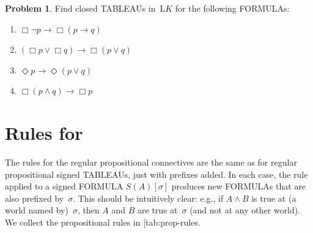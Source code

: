 \documentclass[10pt,a4paper]{article}
\makeatletter
\newcommand*{\olup}[1]{\MakeUppercase{#1}}
\theoremstyle{plain}
\theoremstyle{definition}
\newtheorem{prob}{Problem}[section]
\theoremstyle{remark}
\newcommand*{\olfileid}[3]{}
\newcommand*{\olsection}[1]{\section*{#1}}
\newcommand{\olref}{\@ifnextchar[{\olref@i}{\olref@final}}
\def\olref@i[#1]{\@ifnextchar[{\olref@ii}{\olref@final}}
\def\olref@ii[#1]{\@ifnextchar[{\olref@iii}{\olref@final}}
\def\olref@iii[#1]{\olref@final}
\def\olref@final#1{\ref{#1}}
\providecommand{\lif}{\mathbin{\rightarrow}}
\providecommand{\sFmla}[2]{#1(#2)}
\providecommand{\Log}{\ensuremath{\mathrm{L}}}
\providecommand{\Ax}{\mathrm{Ax}}
\makeatother
\begin{document}
\begin{prob}
  Find closed \olup{tableau}s in~$\Log{K}$ for the following \olup{formula}s:
  \begin{enumerate}
    \item $\Box \lnot p \lif \Box(p \lif q)$
    \item $(\Box p \lor \Box q) \lif \Box(p \lor q)$
    \item $\Diamond p \lif \Diamond(p \lor q)$
    \item $\Box(p \land q) \lif \Box p$
  \end{enumerate}
\end{prob}





\olfileid{nml}{tab}{rul}

\olsection{Rules for \Ax{K}}

The rules for the regular propositional connectives are the same as
for regular propositional signed \olup{tableau}s, just with prefixes
added. In each case, the rule applied to a signed \olup{formula}
$\sFmla{S}{A}[\sigma]$ produces new \olup{formula}s that are also
prefixed by~$\sigma$. This should be intuitively clear: e.g., if $A
\land B$ is true at (a world named by)~$\sigma$, then $A$ and $B$
are true at~$\sigma$ (and not at any other world). We collect the
propositional rules in \olref{tab:prop-rules}.
\end{document}
